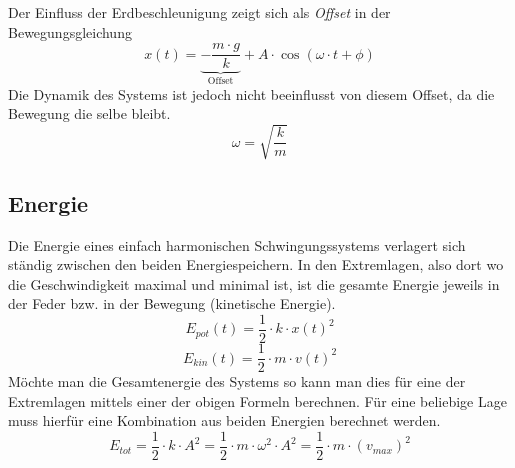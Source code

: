 Der Einfluss der Erdbeschleunigung zeigt sich als \textit{Offset} in
der Bewegungsgleichung
\[ \boxed{x(t) = \underbrace{-\frac{m \cdot g}{k}}_{\text{Offset}} 
	+ A \cdot \cos(\omega \cdot t + \phi)} \]
Die Dynamik des Systems ist jedoch nicht beeinflusst von diesem 
Offset, da die Bewegung die selbe bleibt.
\[ \boxed{\omega = \sqrt{\frac{k}{m}}} \]

\subsection{Energie}
Die Energie eines einfach harmonischen Schwingungssystems verlagert
sich ständig zwischen den beiden Energiespeichern. In den Extremlagen,
also dort wo die Geschwindigkeit maximal und minimal ist, ist die
gesamte Energie jeweils in der Feder bzw. in der Bewegung (kinetische
Energie).
\[ \boxed{E_{pot}(t) = \frac{1}{2} \cdot k \cdot x(t)^2} \]
\[ \boxed{E_{kin}(t) = \frac{1}{2} \cdot m \cdot v(t)^2} \]
Möchte man die Gesamtenergie des Systems so kann man dies für eine
der Extremlagen mittels einer der obigen Formeln berechnen. Für eine
beliebige Lage muss hierfür eine Kombination aus beiden Energien
berechnet werden.
\[ \boxed{E_{tot} = \frac{1}{2} \cdot k \cdot A^2 
= \frac{1}{2} \cdot m \cdot \omega^2 \cdot A^2 
= \frac{1}{2} \cdot m \cdot (v_{max})^2} \]
